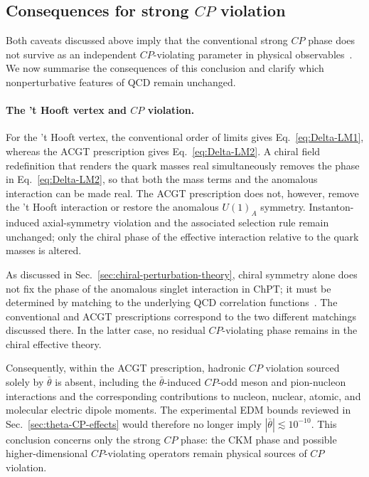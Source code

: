 \documentclass[review]{elsarticle}
\numberwithin{equation}{section}
\numberwithin{table}{section}
\numberwithin{figure}{section}
\begin{document}
\subsection{Consequences for strong \texorpdfstring{$CP$}{CP} violation}
\label{sec:reassessment-consequences}

Both caveats discussed above imply that the conventional strong $CP$ phase does not survive as an independent $CP$-violating parameter in physical observables~\cite{Ai:2020ptm,Ai:2024vfa,Ai:2024cnp}. We now summarise the consequences of this conclusion and clarify which nonperturbative features of QCD remain unchanged.

\paragraph{The 't Hooft vertex and $CP$ violation.}

For the 't Hooft vertex, the conventional order of limits gives Eq.~\eqref{eq:Delta-LM1}, whereas the ACGT prescription gives Eq.~\eqref{eq:Delta-LM2}. A chiral field redefinition that renders the quark masses real simultaneously removes the phase in Eq.~\eqref{eq:Delta-LM2}, so that both the mass terms and the anomalous interaction can be made real. The ACGT prescription does not, however, remove the 't Hooft interaction or restore the anomalous $U(1)_A$ symmetry. Instanton-induced axial-symmetry violation and the associated selection rule remain unchanged; only the chiral phase of the effective interaction relative to the quark masses is altered.

As discussed in Sec.~\ref{sec:chiral-perturbation-theory}, chiral symmetry alone does not fix the phase of the anomalous singlet interaction in ChPT; it must be determined by matching to the underlying QCD correlation functions~\cite{Ai:2020ptm,Ai:2024cnp,Ai:2025quf}. The conventional and ACGT prescriptions correspond to the two different matchings discussed there. In the latter case, no residual $CP$-violating phase remains in the chiral effective theory.

Consequently, within the ACGT prescription, hadronic $CP$ violation sourced solely by $\bar\theta$ is absent, including the $\bar\theta$-induced $CP$-odd meson and pion-nucleon interactions and the corresponding contributions to nucleon, nuclear, atomic, and molecular electric dipole moments. The experimental EDM bounds reviewed in Sec.~\ref{sec:theta-CP-effects} would therefore no longer imply $|\bar\theta|\lesssim10^{-10}$. This conclusion concerns only the strong $CP$ phase: the CKM phase and possible higher-dimensional $CP$-violating operators remain physical sources of $CP$ violation.
\end{document}

